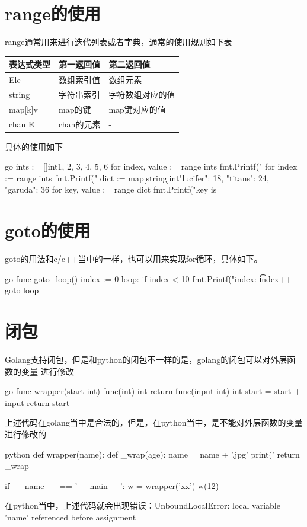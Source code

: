 \section{range的使用}
range通常用来进行迭代列表或者字典，通常的使用规则如下表
\begin{center}
  \begin{tabularx}{\textwidth}{|X|X|X|}
  \hline
  表达式类型& 第一返回值& 第二返回值\\ \hline
  [n]Ele& 数组索引值& 数组元素 \\
  string& 字符串索引& 字符数组对应的值\\
  map[k]v& map的键 & map键对应的值\\
  chan E & chan的元素 & - \\ \hline
  \end{tabularx}
  \label{tab:usage_of_range}
\end{center}

具体的使用如下
\begin{code-block}{go}
ints := []int{1, 2, 3, 4, 5, 6}
for index, value := range ints {
    fmt.Printf("%
}
for index := range ints {
    fmt.Printf("%
}
dict := map[string]int{"lucifer": 18, "titans": 24, "garuda": 36}
for key, value := range dict {
    fmt.Printf("key is %
}
\end{code-block}

\section{goto的使用}
goto的用法和c/c++当中的一样，也可以用来实现for循环，具体如下。
\begin{code-block}{go}
func goto_loop() {
    index := 0
loop:
    if index < 10 {
        fmt.Printf("index: \t%
        index++
        goto loop
    }
}
\end{code-block}

\section{闭包}
Golang支持闭包，但是和python的闭包不一样的是，golang的闭包可以对外层函数的变量
进行修改
\begin{code-block}{go}
func wrapper(start int) func(int) int {
    return func(input int) int {
        start = start + input
        return start
    }
}
\end{code-block}
上述代码在golang当中是合法的，但是，在python当中，是不能对外层函数的变量进行修改的
\begin{code-block}{python}
def wrapper(name):
    def _wrap(age):
        name = name + '.jpg'
        print('%
    return _wrap


if __name__ == '__main__':
    w = wrapper('xx')
    w(12)
\end{code-block}
在python当中，上述代码就会出现错误：UnboundLocalError: local variable 'name' referenced before assignment

